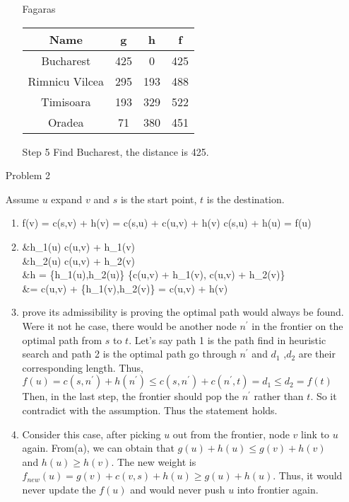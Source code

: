 \normalfont\documentclass[letterpaper,11pt]{article}
\begin{document}
\begin{enumerate}
\begin{enumerate}
			Fagaras\\
			\begin{tabular}{|c|c|c|c|}
				\hline
				Name & g & h & f\\
				\hline
				Bucharest & 425 & 0 & 425\\
				Rimnicu Vilcea &  295 & 193 & 488\\
				Timisoara & 193 &  329 & 522\\
				Oradea & 71 & 380 & 451\\
				\hline
			\end{tabular}
		\item [Step 5]
			Find Bucharest, the distance is 425.
	\end{enumerate}
\item[Problem 2]\par
	Assume $u$ expand $v$ and $s$ is the start point, $t$ is the destination.\\
	\begin{enumerate}	
		\item
		\begin{flalign*}
			f(v) = c(s,v) + h(v) = c(s,u) + c(u,v) + h(v) \ge c(s,u) + h(u) = f(u)
		\end{flalign*}
		\item
		\begin{flalign*}
		&h_1(u) \le c(u,v) + h_1(v)\\
		&h_2(u) \le c(u,v) + h_2(v)\\
		&h = \max\{h_1(u),h_2(u)\} \le \max\{c(u,v) + h_1(v), c(u,v) + h_2(v)\}\\
		&= c(u,v) + \max\{h_1(v),h_2(v)\} = c(u,v) + h(v)
		\end{flalign*}
		\item prove its admissibility is proving the optimal path would always be found. Were it not he case, there would be another node $n^\prime$ in the frontier on the optimal path from $s$ to $t$. Let's say path 1 is the path find in heuristic search and path 2 is the optimal path go through $n^\prime$ and $d_1$ ,$d_2$ are their corresponding length. Thus,\\$f(u) = c(s,n^\prime) + h(n^\prime) \le c(s,n^\prime) + c(n^\prime,t) = d_1 \le d_2 = f(t)$\\
		Then, in the last step, the frontier should pop the $n^\prime$ rather than $t$. So it contradict with the assumption. Thus the statement holds.
		\item Consider this case, after picking $u$ out from the frontier, node $v$ link to $u$ again. From(a), we can obtain that $g(u) + h(u) \le g(v) + h(v)$ and $h(u) \ge h(v)$. The new weight is $f_{new}(u) = g(v) + c(v,s) + h(u) \ge g(u) + h(u)$. Thus, it would never update the $f(u)$ and would never push $u$ into frontier again.

\end{enumerate}
\end{enumerate}
\end{document}
